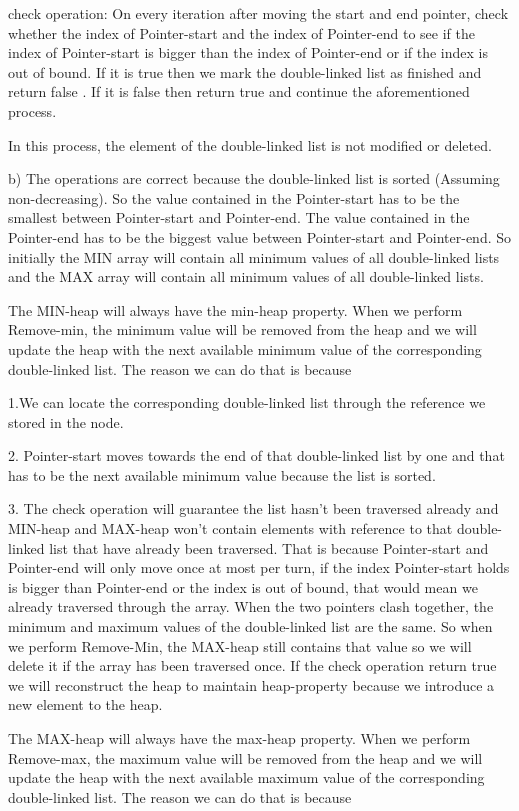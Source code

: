 \documentclass[12pt]{article}
\begin{document}
check operation: On every iteration after moving the start and end pointer, check whether the index of Pointer-start and the index of Pointer-end to see if the index of Pointer-start is bigger than the index of Pointer-end or if the index is out of bound. If it is true then we mark the double-linked list as finished and return false . If it is false then return true and continue the aforementioned process.

In this process, the element of the double-linked list is not modified or deleted.

b) The operations are correct because the double-linked list is sorted (Assuming non-decreasing). So the value contained in the Pointer-start has to be the smallest between Pointer-start and Pointer-end. The value contained in the Pointer-end has to be the biggest value between Pointer-start and Pointer-end. So initially the MIN array will contain all minimum values of all double-linked lists and the MAX array will contain all minimum values of all double-linked lists. 

The MIN-heap will always have the min-heap property. When we perform Remove-min, the minimum value will be removed from the heap and we will update the heap with the next available minimum value of the corresponding double-linked list. The reason we can do that is because 

1.We can locate the corresponding double-linked list through the reference we stored in the node.

2. Pointer-start moves towards the end of that double-linked list by one and that has to be the next available minimum value because the list is sorted. 

3. The check operation will guarantee the list hasn't been traversed already and MIN-heap and MAX-heap won't contain elements with reference to that double-linked list that have already been traversed. That is because Pointer-start and Pointer-end will only move once at most per turn, if the index Pointer-start holds is bigger than Pointer-end or the index is out of bound, that would mean we already traversed through the array.  When the two pointers clash together, the minimum and maximum values of the double-linked list are the same. So when we perform Remove-Min, the MAX-heap still contains that value so we will delete it if the array has been traversed once. If the check operation return true we will reconstruct the heap to maintain heap-property because we introduce a new element to the heap.

The MAX-heap will always have the max-heap property. When we perform Remove-max, the maximum value will be removed from the heap and we will update the heap with the next available maximum value of the corresponding double-linked list. The reason we can do that is because 
\end{document}

